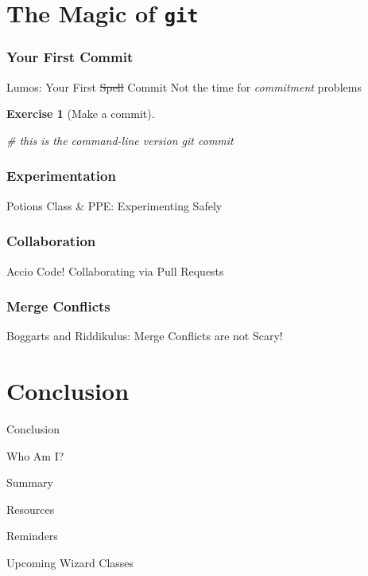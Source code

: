 \documentclass{beamer}
\theoremstyle{example}
\newtheorem{exercise}{Exercise}
\begin{document}
\part{The Magic of \texttt{git}}
\frame{\partpage}
\frame{\tableofcontents[part=2]}

\section{Your First Commit}
\begin{frame}[fragile]{Lumos: Your First \sout{Spell} Commit}
    Not the time for \emph{commitment} problems
    \begin{exercise}[Make a commit]
        \begin{shell}
# this is the command-line version
git commit
        \end{shell}
    \end{exercise}
\end{frame}

\section{Experimentation}
\begin{frame}{Potions Class \& PPE\@: Experimenting Safely}
\end{frame}

\section{Collaboration}
\begin{frame}{Accio Code! Collaborating via Pull Requests}
\end{frame}

\section{{\textdagger}Merge Conflicts{\textdagger}}
\begin{frame}{Boggarts and Riddikulus: Merge Conflicts are \alert{not} Scary!}
\end{frame}

\part{Conclusion}
\begin{frame}{Conclusion}
    \begin{block}{Who Am I?}
    \end{block}
    \begin{block}{Summary}
    \end{block}
    \begin{block}{Resources}
    \end{block}
    \begin{block}{Reminders}
    \end{block}
    \begin{block}{Upcoming Wizard Classes}
    \end{block}
\end{frame}

\end{document}
